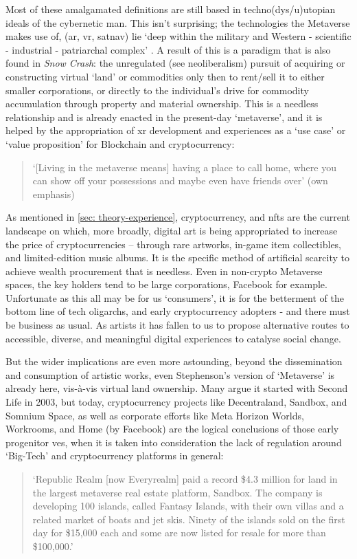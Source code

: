 Most of these amalgamated definitions are still based in techno(dys/u)utopian ideals of the cybernetic man. This isn't surprising; the technologies the Metaverse makes use of, (\gls{ar}, \gls{vr}, \gls{satnav}) lie `deep within the military and Western - scientific - industrial - patriarchal complex' \citep{davies2004}. A result of this is a paradigm that is also found in \textit{Snow Crash}: the unregulated (see neoliberalism) pursuit of acquiring or constructing virtual `land' or commodities only then to rent/sell it to either smaller corporations, or directly to the individual's drive for commodity accumulation through property and material ownership. This is a needless relationship and is already enacted in the present-day `metaverse', and it is helped by the appropriation of \gls{xr} development and experiences as a `use case' or `value proposition' for Blockchain and cryptocurrency:
\begin{quote}
    `[Living in the metaverse means] having a place to call home, where you can show off your possessions and maybe even have friends over' (own emphasis) \citep[]{marr2022}
\end{quote}
As mentioned in \autoref{sec: theory-experience}, cryptocurrency, and \glspl{nft} are the current landscape on which, more broadly, digital art is being appropriated to increase the price of cryptocurrencies -- through rare artworks, in-game item collectibles, and limited-edition music albums. It is the specific method of artificial scarcity to achieve wealth procurement that is needless. Even in non-crypto Metaverse spaces, the key holders tend to be large corporations, Facebook for example. Unfortunate as this all may be for us `consumers', it is for the betterment of the bottom line of tech oligarchs, and early cryptocurrency adopters - and there must be business as usual. As artists it has fallen to us to propose alternative routes to accessible, diverse, and meaningful digital experiences to catalyse social change.

But the wider implications are even more astounding, beyond the dissemination and consumption of artistic works, even Stephenson's version of `Metaverse' is already here, vis-à-vis virtual land ownership. Many argue it started with Second Life in 2003, but today, cryptocurrency projects like Decentraland, Sandbox, and Somnium Space, as well as corporate efforts like Meta Horizon Worlds, Workrooms, and Home (by Facebook) are the logical conclusions of those early progenitor \glspl{ve}, when it is taken into consideration the lack of regulation around `Big-Tech' and cryptocurrency platforms in general:
\begin{quote}
    `Republic Realm [now Everyrealm] paid a record \$4.3 million for land in the largest metaverse real estate platform, Sandbox. The company is developing 100 islands, called Fantasy Islands, with their own villas and a related market of boats and jet skis. Ninety of the islands sold on the first day for \$15,000 each and some are now listed for resale for more than \$100,000.' \citep[]{frank2022}
\end{quote}

